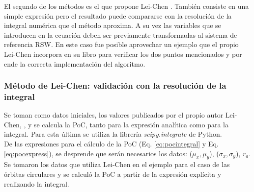 El segundo de los m\'etodos es el que propone Lei-Chen \citep{leichen}. Tambi\'en consiste en una simple expresi\'on pero el resultado puede compararse con la resoluci\'on de la integral num\'erica que el m\'etodo aproxima. A su vez las variables que se introducen en la ecuaci\'on deben ser previamente transformadas al sistema de referencia RSW. En este caso fue posible aprovechar un ejemplo que el propio Lei-Chen incorpora en su libro para verificar los dos puntos mencionados y por ende la correcta implementaci\'on del algoritmo.

\subsubsection*{M\'etodo de Lei-Chen: validaci\'on con la resoluci\'on de la integral}
Se toman como datos iniciales, los valores publicados por el propio autor Lei-Chen, \citep{leichen}, y se calcula la PoC, tanto para la expresi\'on anal\'itica como para la integral. Para esta \'ultima se utiliza la librer\'ia {\it{scipy.integrate}}  de Python.\\

De las expresiones para el c\'alculo de la PoC (Eq. \ref{eq:pocintegral} y Eq. \ref{eq:pocexpress}), se desprende que ser\'an necesarios los datos: ($\mu_{x}, \mu_{y}$), ($\sigma_{x}, \sigma_{y}$), $r_{a}$.\\

Se tomaron los datos que utiliza Lei-Chen en el ejemplo para el caso de las \'orbitas circulares y se calcul\'o la PoC a partir de la expresi\'on expl\'icita y realizando la integral.\\

